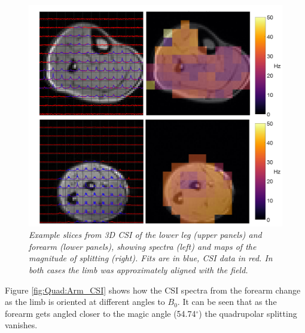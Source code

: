 \begin{figure}
    \centering
    \includegraphics[width=1\textwidth]{Figures/Quad/Calf_Arm_CSI.png}
    \caption{\textit{Example slices from 3D \ac{CSI} of the lower leg (upper panels) and forearm (lower panels), showing spectra (left) and maps of the magnitude of splitting (right). Fits are in blue, CSI data in red. In both cases the limb was approximately aligned with the field.}}
    \label{fig:Quad:Calf_Arm_CSI}
\end{figure}

Figure \ref{fig:Quad:Arm_CSI} shows how the \ac{CSI} spectra from the forearm change as the limb is oriented at different angles to $B_0$. It can be seen that as the forearm gets angled closer to the magic angle (54.74$^\circ$) the quadrupolar splitting vanishes. 

